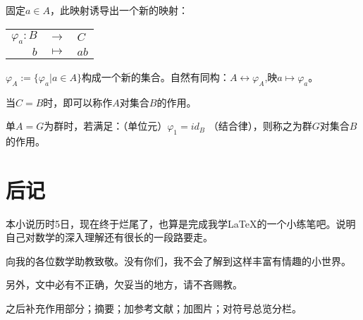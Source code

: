 \documentclass[UTF8]{ctexart}
\begin{document}
固定$a \in A$，此映射诱导出一个新的映射：

\begin{center}
    \begin{tabular}{rcl}
    $\varphi_a:B$&$\rightarrow$&$C$  \\
    $b$ &$\mapsto$&$ab$
    \end{tabular}
\end{center}

$\varphi_A:=\big\{\varphi_a \big| a \in A \big\}$构成一个新的集合。自然有同构：$A \leftrightarrow \varphi_A$,映$a \mapsto \varphi_a$。

当$C=B$时，即可以称作$A$对集合$B$的作用。

单$A=G$为群时，若满足：（单位元）$\varphi_1 =id_B$
（结合律），则称之为群$G$对集合$B$的作用。

\section{后记}

本小说历时5日，现在终于烂尾了，也算是完成我学\LaTeX 的一个小练笔吧。说明自己对数学的深入理解还有很长的一段路要走。

向我的各位数学助教致敬。没有你们，我不会了解到这样丰富有情趣的小世界。

另外，文中必有不正确，欠妥当的地方，请不吝赐教。

之后补充作用部分；摘要；加参考文献；加图片；对符号总览分栏。
\end{document}
